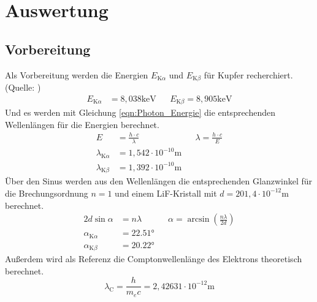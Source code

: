 \section{Auswertung}
\label{sec:Auswertung}


\subsection{Vorbereitung}
Als Vorbereitung werden die Energien $E_{\text{K}\alpha}$ und $E_{\text{K}\beta}$ für Kupfer recherchiert. (Quelle: \cite{CuLit})
\begin{align*}
    E_{\text{K}\alpha} &= 8,038\text{keV}    &&   E_{\text{K}\beta} = 8,905\text{keV} \label{eqn:EnergieKupfer}
\end{align*}
Und es werden mit Gleichung \ref{eqn:Photon_Energie} die entsprechenden Wellenlängen für die Energien berechnet.
\begin{align*}
    E &= \frac{h\cdot c}{\lambda} && \lambda = \frac{h\cdot c}{E} \\
    \lambda_{\text{K}\alpha} &= 1,542\cdot 10^{-10} \text{m} \\
    \lambda_{\text{K}\beta} &= 1,392 \cdot 10^{-10} \text{m} 
\end{align*}
Über den Sinus werden aus den Wellenlängen die entsprechenden Glanzwinkel für die Brechungsordnung $n=1$ und einem LiF-Kristall mit $d = 201,4\cdot10^{-12} \text{m}$ berechnet.
\begin{align*}
   2d\sin{\alpha} &= n\lambda && \alpha = \arcsin \left(\frac{n\lambda}{2d}\right) \\
   \alpha_{\text{K}\alpha} &= 22.51° \\
   \alpha_{\text{K}\beta} &= 20.22°
\end{align*}
Außerdem wird als Referenz die Comptonwellenlänge des Elektrons theoretisch berechnet.
\begin{equation*}
    \lambda_{\text{C}} = \frac{h}{m_e c} = 2,42631 \cdot 10^{-12} \text{m}
\end{equation*}

